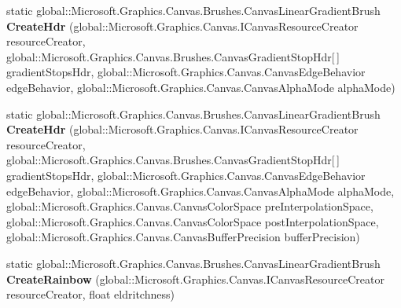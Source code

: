 \begin{DoxyCompactItemize}
\item 
\mbox{\label{class_microsoft_1_1_graphics_1_1_canvas_1_1_brushes_1_1_canvas_linear_gradient_brush_a1a0104bd1c67e8ce9f314d0238d4aca4}} 
static global\+::\+Microsoft.\+Graphics.\+Canvas.\+Brushes.\+Canvas\+Linear\+Gradient\+Brush {\bfseries Create\+Hdr} (global\+::\+Microsoft.\+Graphics.\+Canvas.\+I\+Canvas\+Resource\+Creator resource\+Creator, global\+::\+Microsoft.\+Graphics.\+Canvas.\+Brushes.\+Canvas\+Gradient\+Stop\+Hdr\mbox{[}$\,$\mbox{]} gradient\+Stops\+Hdr, global\+::\+Microsoft.\+Graphics.\+Canvas.\+Canvas\+Edge\+Behavior edge\+Behavior, global\+::\+Microsoft.\+Graphics.\+Canvas.\+Canvas\+Alpha\+Mode alpha\+Mode)
\item 
\mbox{\label{class_microsoft_1_1_graphics_1_1_canvas_1_1_brushes_1_1_canvas_linear_gradient_brush_a0c6d262a63d8d21f04c1bb8c01fb6ac4}} 
static global\+::\+Microsoft.\+Graphics.\+Canvas.\+Brushes.\+Canvas\+Linear\+Gradient\+Brush {\bfseries Create\+Hdr} (global\+::\+Microsoft.\+Graphics.\+Canvas.\+I\+Canvas\+Resource\+Creator resource\+Creator, global\+::\+Microsoft.\+Graphics.\+Canvas.\+Brushes.\+Canvas\+Gradient\+Stop\+Hdr\mbox{[}$\,$\mbox{]} gradient\+Stops\+Hdr, global\+::\+Microsoft.\+Graphics.\+Canvas.\+Canvas\+Edge\+Behavior edge\+Behavior, global\+::\+Microsoft.\+Graphics.\+Canvas.\+Canvas\+Alpha\+Mode alpha\+Mode, global\+::\+Microsoft.\+Graphics.\+Canvas.\+Canvas\+Color\+Space pre\+Interpolation\+Space, global\+::\+Microsoft.\+Graphics.\+Canvas.\+Canvas\+Color\+Space post\+Interpolation\+Space, global\+::\+Microsoft.\+Graphics.\+Canvas.\+Canvas\+Buffer\+Precision buffer\+Precision)
\item 
\mbox{\label{class_microsoft_1_1_graphics_1_1_canvas_1_1_brushes_1_1_canvas_linear_gradient_brush_a521b2a32aa6e7539839397dae253b7a8}} 
static global\+::\+Microsoft.\+Graphics.\+Canvas.\+Brushes.\+Canvas\+Linear\+Gradient\+Brush {\bfseries Create\+Rainbow} (global\+::\+Microsoft.\+Graphics.\+Canvas.\+I\+Canvas\+Resource\+Creator resource\+Creator, float eldritchness)
\item 
\mbox{\label{class_microsoft_1_1_graphics_1_1_canvas_1_1_brushes_1_1_canvas_linear_gradient_brush_a1164597be8c9b0ac875ac18fdb1f8965}} 

\end{DoxyCompactItemize}

